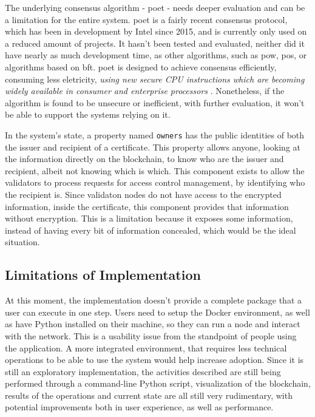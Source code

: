 The underlying consensus algorithm - \gls{poet} - needs deeper evaluation and can be a limitation for the entire system. \gls{poet} is a fairly recent consensus protocol, which has been in development by Intel since 2015, and is currently only used on a reduced amount of projects. It hasn't been tested and evaluated, neither did it have nearly as much development time, as other algorithms, such as \gls{pow}, \gls{pos}, or algorithms based on \gls{bft}. \gls{poet} is designed to achieve consensus efficiently, consuming less eletricity, \emph{using new secure CPU instructions which are becoming widely available in consumer and enterprise processors} \cite{intel_poet}. Nonetheless, if the algorithm is found to be unsecure or inefficient, with further evaluation, it won't be able to support the systems relying on it.

In the system's state, a property named \texttt{owners} has the public identities of both the issuer and recipient of a certificate. This property allows anyone, looking at the information directly on the blockchain, to know who are the issuer and recipient, albeit not knowing which is which. This component exists to allow the validators to process requests for access control management, by identifying who the recipient is. Since validaton nodes do not have access to the encrypted information, inside the certificate, this component provides that information without encryption. This is a limitation because it exposes some information, instead of having every bit of information concealed, which would be the ideal situation.

\subsection{Limitations of Implementation}

At this moment, the implementation doesn't provide a complete package that a user can execute in one step. Users need to setup the Docker environment, as well as have Python installed on their machine, so they can run a node and interact with the network. This is a usability issue from the standpoint of people using the application. A more integrated environment, that requires less technical operations to be able to use the system would help increase adoption. Since it is still an exploratory implementation, the activities described are still being performed through a command-line Python script, visualization of the blockchain, results of the operations and current state are all still very rudimentary, with potential improvements both in user experience, as well as performance.